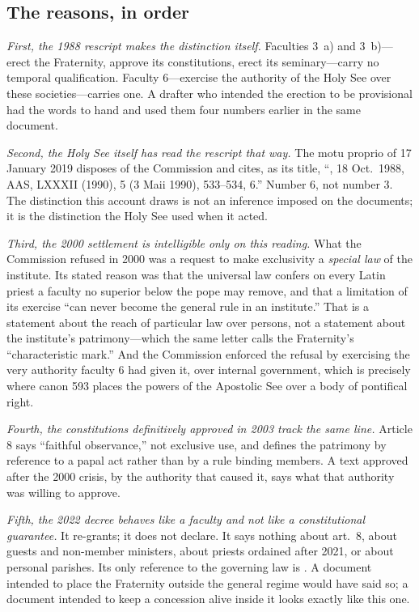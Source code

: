 \subsection{The reasons, in order}

\emph{First, the 1988 rescript makes the distinction itself.} Faculties
3~a) and 3~b)---erect the Fraternity, approve its constitutions, erect its
seminary---carry no temporal qualification. Faculty 6---exercise the
authority of the Holy See over these societies---carries one. A drafter
who intended the erection to be provisional had the words to hand and used
them four numbers earlier in the same document.

\emph{Second, the Holy See itself has read the rescript that way.} The
motu proprio of 17 January 2019 disposes of the Commission and cites, as
its title, ``, 18 Oct.\ 1988,
AAS, LXXXII (1990), 5 (3 Maii 1990), 533--534, 6.'' Number 6, not number
3. The distinction this account draws is not an inference imposed on the
documents; it is the distinction the Holy See used when it acted.

\emph{Third, the 2000 settlement is intelligible only on this reading.}
What the Commission refused in 2000 was a request to make exclusivity a
\emph{special law} of the institute. Its stated reason was that the
universal law confers on every Latin priest a faculty no superior below the
pope may remove, and that a limitation of its exercise ``can never become
the general rule in an institute.'' That is a statement about the reach of
particular law over persons, not a statement about the institute's
patrimony---which the same letter calls the Fraternity's ``characteristic
mark.'' And the Commission enforced the refusal by exercising the very
authority faculty 6 had given it, over internal government, which is
precisely where canon 593 places the powers of the Apostolic See over a
body of pontifical right.

\emph{Fourth, the constitutions definitively approved in 2003 track the
same line.} Article 8 says ``faithful observance,'' not exclusive use, and
defines the patrimony by reference to a papal act rather than by a rule
binding members. A text approved after the 2000 crisis, by the authority
that caused it, says what that authority was willing to approve.

\emph{Fifth, the 2022 decree behaves like a faculty and not like a
constitutional guarantee.} It re-grants; it does not declare. It says
nothing about  art.~8, about guests and
non-member ministers, about priests ordained after 2021, or about
personal parishes. Its only reference to the governing law is
. A
document intended to place the Fraternity outside the general regime would
have said so; a document intended to keep a concession alive inside it
looks exactly like this one.


